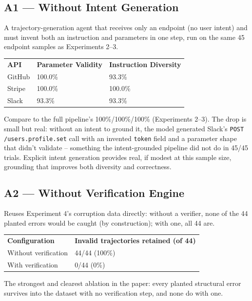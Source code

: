 \documentclass[11pt]{article}
\begin{document}
\subsection{A1 --- Without Intent Generation}
A trajectory-generation agent that receives only an endpoint (no user intent) and must invent both
an instruction and parameters in one step, run on the same 45 endpoint samples as Experiments 2--3.

\begin{center}
\begin{tabular}{lll}
\textbf{API} & \textbf{Parameter Validity} & \textbf{Instruction Diversity} \\
GitHub & 100.0\% & 93.3\% \\
Stripe & 100.0\% & 100.0\% \\
Slack & 93.3\% & 93.3\% \\
\end{tabular}
\end{center}

Compare to the full pipeline's 100\%/100\%/100\% (Experiments 2--3). The drop is small but real:
without an intent to ground it, the model generated Slack's \texttt{POST /users.profile.set} call
with an invented \texttt{token} field and a parameter shape that didn't validate -- something the
intent-grounded pipeline did not do in 45/45 trials. Explicit intent generation provides real,
if modest at this sample size, grounding that improves both diversity and correctness.

\subsection{A2 --- Without Verification Engine}
Reuses Experiment 4's corruption data directly: without a verifier, none of the 44 planted errors
would be caught (by construction); with one, all 44 are.

\begin{center}
\begin{tabular}{ll}
\textbf{Configuration} & \textbf{Invalid trajectories retained (of 44)} \\
Without verification & 44/44 (100\%) \\
With verification & 0/44 (0\%) \\
\end{tabular}
\end{center}

The strongest and clearest ablation in the paper: every planted structural error survives into the
dataset with no verification step, and none do with one.
\end{document}
